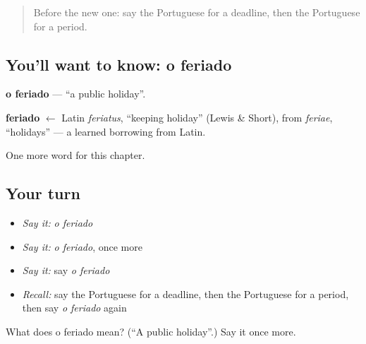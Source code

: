 \label{lesson:PT-C212-feriado}



\begin{quote}
Before the new one: say the Portuguese for a deadline, then the Portuguese for a period.
\end{quote}

\subsection*{You'll want to know: o feriado}
\textbf{o feriado} — \textquotedblleft{}a public holiday\textquotedblright{}.

\begin{cousinweb}
\textbf{feriado} $\leftarrow$ Latin \emph{feriatus}, \textquotedblleft{}keeping holiday\textquotedblright{} (Lewis \& Short), from \emph{feriae}, \textquotedblleft{}holidays\textquotedblright{} — a learned borrowing from Latin.
\end{cousinweb}

\begin{grammarlens}[title={What you've built}]
One more word for this chapter.
\end{grammarlens}

\subsection*{Your turn}
\begin{itemize}
\raggedright
  \item \emph{Say it:} \emph{o feriado}
  \item \emph{Say it:} \emph{o feriado}, once more
  \item \emph{Say it:} say \emph{o feriado}
  \item \emph{Recall:} say the Portuguese for a deadline, then the Portuguese for a period, then say \emph{o feriado} again
\end{itemize}

\begin{tcolorbox}[breakable,colback=teal!4,colframe=teal!35!black,title={Before you move on}]
What does o feriado mean? (\textquotedblleft{}A public holiday\textquotedblright{}.) Say it once more.
\end{tcolorbox}
